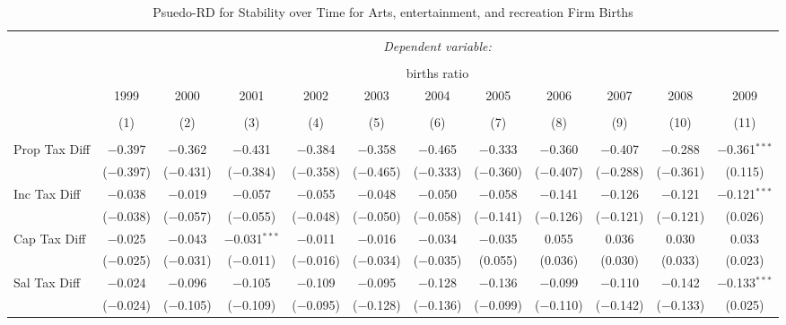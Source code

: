 
\begin{table}[!htbp] \centering 
  \caption{Psuedo-RD for Stability over Time for  Arts, entertainment, and recreation Firm Births} 
  \label{71year} 
\small 
\begin{tabular}{@{\extracolsep{5pt}}lccccccccccc} 
\\[-1.8ex]\hline 
\hline \\[-1.8ex] 
 & \multicolumn{11}{c}{\textit{Dependent variable:}} \\ 
\cline{2-12} 
\\[-1.8ex] & \multicolumn{11}{c}{births ratio} \\ 
 & 1999 & 2000 & 2001 & 2002 & 2003 & 2004 & 2005 & 2006 & 2007 & 2008 & 2009 \\ 
\\[-1.8ex] & (1) & (2) & (3) & (4) & (5) & (6) & (7) & (8) & (9) & (10) & (11)\\ 
\hline \\[-1.8ex] 
 Prop Tax Diff & $-$0.397 & $-$0.362 & $-$0.431 & $-$0.384 & $-$0.358 & $-$0.465 & $-$0.333 & $-$0.360 & $-$0.407 & $-$0.288 & $-$0.361$^{***}$ \\ 
  & ($-$0.397) & ($-$0.431) & ($-$0.384) & ($-$0.358) & ($-$0.465) & ($-$0.333) & ($-$0.360) & ($-$0.407) & ($-$0.288) & ($-$0.361) & (0.115) \\ 
  Inc Tax Diff & $-$0.038 & $-$0.019 & $-$0.057 & $-$0.055 & $-$0.048 & $-$0.050 & $-$0.058 & $-$0.141 & $-$0.126 & $-$0.121 & $-$0.121$^{***}$ \\ 
  & ($-$0.038) & ($-$0.057) & ($-$0.055) & ($-$0.048) & ($-$0.050) & ($-$0.058) & ($-$0.141) & ($-$0.126) & ($-$0.121) & ($-$0.121) & (0.026) \\ 
  Cap Tax Diff & $-$0.025 & $-$0.043 & $-$0.031$^{***}$ & $-$0.011 & $-$0.016 & $-$0.034 & $-$0.035 & 0.055 & 0.036 & 0.030 & 0.033 \\ 
  & ($-$0.025) & ($-$0.031) & ($-$0.011) & ($-$0.016) & ($-$0.034) & ($-$0.035) & (0.055) & (0.036) & (0.030) & (0.033) & (0.023) \\ 
  Sal Tax Diff & $-$0.024 & $-$0.096 & $-$0.105 & $-$0.109 & $-$0.095 & $-$0.128 & $-$0.136 & $-$0.099 & $-$0.110 & $-$0.142 & $-$0.133$^{***}$ \\ 
  & ($-$0.024) & ($-$0.105) & ($-$0.109) & ($-$0.095) & ($-$0.128) & ($-$0.136) & ($-$0.099) & ($-$0.110) & ($-$0.142) & ($-$0.133) & (0.025) \\ 

\end{tabular}
\end{table}
